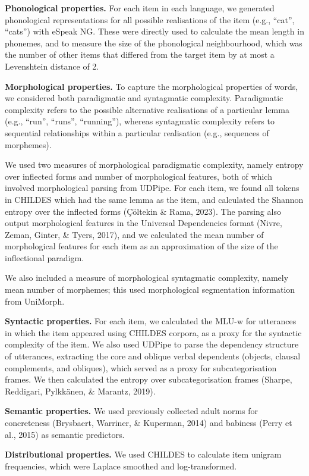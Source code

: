 \documentclass[10pt, letterpaper]{article}
\begin{document}
\textbf{Phonological properties.} For each item in each language, we
generated phonological representations for all possible realisations of
the item (e.g., ``cat'', ``cats'') with eSpeak NG. These were directly
used to calculate the mean length in phonemes, and to measure the size
of the phonological neighbourhood, which was the number of other items
that differed from the target item by at most a Levenshtein distance of
2.

\textbf{Morphological properties.} To capture the morphological
properties of words, we considered both paradigmatic and syntagmatic
complexity. Paradigmatic complexity refers to the possible alternative
realisations of a particular lemma (e.g., ``run'', ``runs'',
``running''), whereas syntagmatic complexity refers to sequential
relationships within a particular realisation (e.g., sequences of
morphemes).

We used two measures of morphological paradigmatic complexity, namely
entropy over inflected forms and number of morphological features, both
of which involved morphological parsing from UDPipe. For each item, we
found all tokens in CHILDES which had the same lemma as the item, and
calculated the Shannon entropy over the inflected forms (Çöltekin \&
Rama, 2023). The parsing also output morphological features in the
Universal Dependencies format (Nivre, Zeman, Ginter, \& Tyers, 2017),
and we calculated the mean number of morphological features for each
item as an approximation of the size of the inflectional paradigm.

We also included a measure of morphological syntagmatic complexity,
namely mean number of morphemes; this used morphological segmentation
information from UniMorph.

\textbf{Syntactic properties.} For each item, we calculated the MLU-w
for utterances in which the item appeared using CHILDES corpora, as a
proxy for the syntactic complexity of the item. We also used UDPipe to
parse the dependency structure of utterances, extracting the core and
oblique verbal dependents (objects, clausal complements, and obliques),
which served as a proxy for subcategorisation frames. We then calculated
the entropy over subcategorisation frames (Sharpe, Reddigari, Pylkkänen,
\& Marantz, 2019).

\textbf{Semantic properties.} We used previously collected adult norms
for concreteness (Brysbaert, Warriner, \& Kuperman, 2014) and babiness
(Perry et al., 2015) as semantic predictors.

\textbf{Distributional properties.} We used CHILDES to calculate item
unigram frequencies, which were Laplace smoothed and log-transformed.
\end{document}
